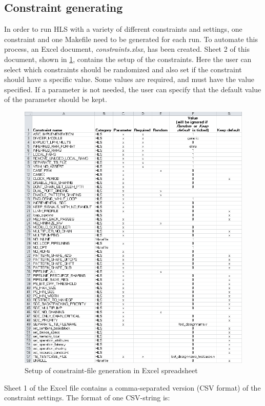 \subsection{Constraint generating}
In order to run HLS with a variety of different constraints and settings, one constraint and one Makefile need to be generated for each run. To automate this process, an Excel document, \textit{constraints.xlsx}, has been created. Sheet 2 of this document, shown in \cref{fig:excelconstraintssetup}, contains the setup of the constraints. Here the user can select which constraints should be randomized and also set if the constraint should have a specific value. Some values are required, and must have the value specified. If a parameter is not needed, the user can specify that the default value of the parameter should be kept. 
\begin{figure}[hbpt]
\centering
\includegraphics[width=\textwidth]{../figs/ConstraintGenerationSetup.png}
\caption{\label{fig:excelconstraintssetup}Setup of constraint-file generation in Excel spreadsheet}
\end{figure}
Sheet 1 of the Excel file contains a comma-separated version (CSV format) of the constraint settings. The format of one CSV-string is:
